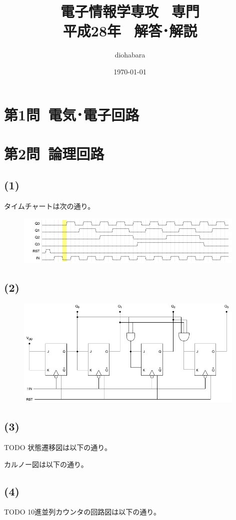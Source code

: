 \documentclass[a4paper,12pt,xelatex,ja=standard]{bxjsarticle}
\title{電子情報学専攻 \, 専門 \\ 平成28年 \, 解答･解説}
\author{diohabara}
\date{\today}
\begin{document}
\maketitle

\section*{第1問\ 電気･電子回路}

\section*{第2問\ 論理回路}
\subsection*{(1)}
タイムチャートは次の通り。
\begin{figure}[H]
  \centering
  \includegraphics[width=11cm]{images/2017_timechart.png}
\end{figure}

\subsection*{(2)}
\begin{figure}[H]
  \centering
  \includegraphics[width=11cm]{images/2017_synchronous_counter.png}
\end{figure}

\subsection*{(3)}
TODO
状態遷移図は以下の通り。

カルノー図は以下の通り。

\subsection*{(4)}
TODO
10進並列カウンタの回路図は以下の通り。
\end{document}
